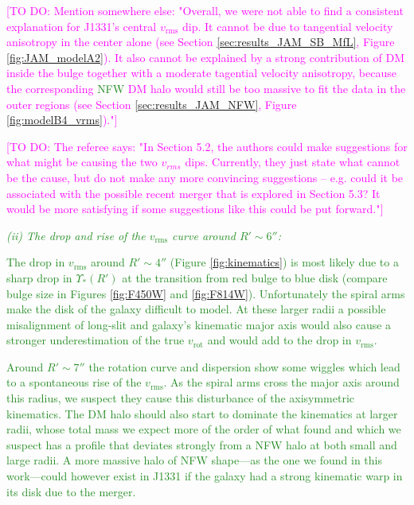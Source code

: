 \documentclass[useAMS,usenatbib]{mnras}
\newcommand{\Wilma}[1]{\textcolor{Magenta}{#1}}
\newcommand{\NEW}[1]{\textcolor{ForestGreen}{#1}}
\newcommand{\OLD}[1]{}
\begin{document}
\OLD{Another feature in the stellar kinematics that none of our JAM models was able to reproduce in the slightest and which we therefore excluded in the modelling, was the dip in $v_\text{rms}$ around $\sim 6''$, which occurs around the transition from bulge to disk (see Figures \ref{fig:F814W} and \ref{fig:kinematics}).}

\Wilma{[TO DO: Mention somewhere else: "Overall, we were not able to find a consistent explanation for J1331's central $v_\text{rms}$ dip. It cannot be due to tangential velocity anisotropy in the center alone (see Section \ref{sec:results_JAM_SB_MfL}, Figure \ref{fig:JAM_modelA2}). It also cannot be explained by a strong contribution of DM inside the bulge together with a moderate tagential velocity anisotropy, because the corresponding \NEW{NFW} DM halo\OLD{s} would still be too massive to fit the data in the outer regions (see Section \ref{sec:results_JAM_NFW}, Figure \ref{fig:modelB4_vrms})."]}


\Wilma{[TO DO: The referee says: "In Section 5.2, the authors could make suggestions for what might be causing the two
$v_{rms}$ dips. Currently, they just state what cannot be the cause, but do not make any
more convincing suggestions – e.g. could it be associated with the possible recent
merger that is explored in Section 5.3? It would be more satisfying if some
suggestions like this could be put forward."]}

\NEW{\emph{(ii) The drop and rise of the $v_\text{rms}$ curve around $R'\sim 6''$:}}

\NEW{The drop in $v_\text{rms}$ around $R'\sim4''$ (Figure \ref{fig:kinematics}) is most likely due to a sharp drop in $\Upsilon_{*}(R')$ at the transition from red bulge to blue disk (compare bulge size in Figures \ref{fig:F450W} and \ref{fig:F814W}). Unfortunately the spiral arms make the disk of the galaxy difficult to model. At these larger radii a possible misalignment of long-slit and galaxy's kinematic major axis would also cause a stronger underestimation of the true $v_\text{rot}$ and would add to the drop in $v_\text{rms}$.}

\NEW{Around $R'\sim7''$ the rotation curve and dispersion show some wiggles which lead to a spontaneous rise of the $v_\text{rms}$. As the spiral arms cross the major axis around this radius, we suspect they cause this disturbance of the axisymmetric kinematics. The DM halo should also start to dominate the kinematics at larger radii, whose total mass we expect more of the order of what \citet{SWELLSV} found and which we suspect has a profile that deviates strongly from a NFW halo at both small and large radii. A more massive halo of NFW shape---as the one we found in this work---could however exist in J1331 if the galaxy had a strong kinematic warp in its disk due to the merger.}
\end{document}
